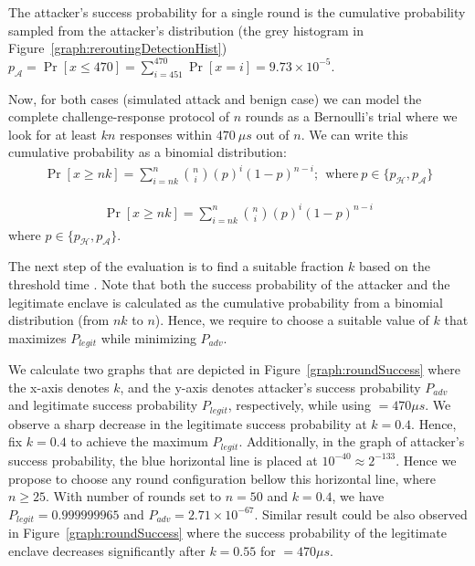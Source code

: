 The attacker's success probability for a single round is the cumulative probability sampled from the attacker's distribution (the grey histogram in Figure~\ref{graph:reroutingDetectionHist}) $p_\mathcal{A} = \Pr[x \leq 470] = \sum_{i=451}^{470}\Pr[x=i] = 9.73 \times 10^{-5}$.


Now, for both cases (simulated attack and benign case) we can model the complete challenge-response protocol of $n$ rounds as a Bernoulli's trial where we look for at least $kn$ responses within $470\ \mu s$ out of $n$. We can write this cumulative probability as a binomial distribution:
%
\ifusenix
\begin{align*}
    \Pr[x \geq nk] = \sum_{i=nk}^n\binom{n}{i} (p)^{i}(1-p)^{n-i};~~\text{where}~ p \in \{p_\mathcal{H}, p_\mathcal{A}\}
\end{align*}

\else
\begin{align*}
    \Pr[x \geq nk] = \sum_{i=nk}^n\binom{n}{i} (p)^{i}(1-p)^{n-i}
\end{align*}
where $p \in \{p_\mathcal{H}, p_\mathcal{A}\}$.
\fi

\ifusenix
\vspace{-10pt}
\else
\fi
{} The next step of the evaluation is to find a suitable fraction $k$ based on the threshold time \connect. Note that both the success probability of the attacker and the legitimate enclave is calculated as the cumulative probability from a binomial distribution (from $nk$ to $n$). Hence, we require to choose a suitable value of $k$ that maximizes $P_{legit}$ while minimizing $P_{adv}$.

We calculate two graphs that are depicted in Figure~\ref{graph:roundSuccess} where the x-axis denotes $k$, and the y-axis denotes attacker's success probability $P_{adv}$ and legitimate success probability $P_{legit}$, respectively, while using \connect$=470 \mu s$. We observe a sharp decrease in the legitimate success probability at $k=0.4$. Hence, fix $k=0.4$ to achieve the maximum $P_{legit}$. Additionally, in the graph of attacker's success probability, the blue horizontal line is placed at $10^{-40} \approx 2^{-133}$. Hence we propose to choose any round configuration bellow this horizontal line, where $n \geq 25$. With number of rounds set to $n=50$ and $k=0.4$, we have $P_{legit}=0.999999965$ and $P_{adv}=2.71\times 10^{-67}$. Similar result could be also observed in Figure~\ref{graph:roundSuccess} where the success probability of the legitimate enclave decreases significantly after $k=0.55$ for \connect$=470\mu s$.

